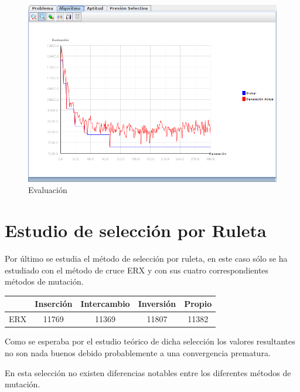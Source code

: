 \documentclass[12pt]{article}
\begin{document}
\begin{figure}[H]
\centering
\includegraphics[scale=0.4]{graficas/fig2graf}
\caption{Evaluación}
\end{figure}   

\section{Estudio de selección por Ruleta}	

	 Por último se estudia el método de selección por ruleta, en este caso sólo se ha estudiado con el método de cruce ERX y con sus cuatro correspondientes métodos de mutación.

\begin{table}[H]
\begin{center}
\begin{tabular}{|ccccc|} \hline
	   & Inserción & Intercambio & Inversión & Propio \\  \hline
ERX    & 11769 & 11369 & 11807 & 11382 \\  \hline
\end{tabular}
\end{center}
\end{table}

	Como se esperaba por el estudio teórico de dicha selección los valores resultantes no son nada buenos debido probablemente a una convergencia prematura.

	En esta selección no existen diferencias notables entre los diferentes métodos de mutación.
\end{document}
